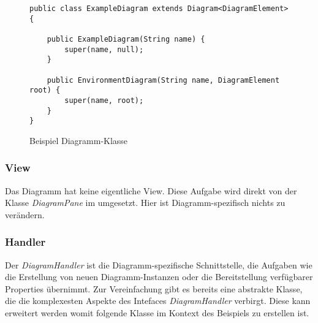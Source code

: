 \begin{figure}[H]
	\centering
	\begin{lstlisting}
public class ExampleDiagram extends Diagram<DiagramElement> {

    public ExampleDiagram(String name) {
        super(name, null);
    }

    public EnvironmentDiagram(String name, DiagramElement root) {
        super(name, root);
    }
}
	\end{lstlisting}
	\caption{Beispiel Diagramm-Klasse}
\end{figure}

\subsubsection{View}
Das Diagramm hat keine eigentliche View. Diese Aufgabe wird direkt von der Klasse \textit{DiagramPane} im
\textit{} umgesetzt. Hier ist Diagramm-spezifisch nichts zu verändern.

\subsubsection{Handler}
Der \textit{DiagramHandler} ist die Diagramm-spezifische Schnittstelle, die Aufgaben wie die Erstellung von neuen
Diagramm-Instanzen oder die Bereitstellung verfügbarer Properties übernimmt. Zur Vereinfachung gibt es bereits eine
abstrakte Klasse, die die komplexesten Aspekte des Intefaces \textit{DiagramHandler} verbirgt. Diese kann erweitert
werden womit folgende Klasse im Kontext des Beispiels zu erstellen ist.

